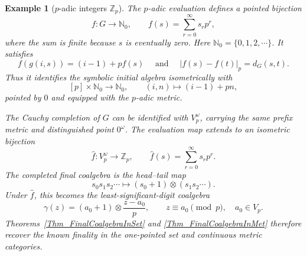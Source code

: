 \documentclass{sn-jnl}%
\theoremstyle{thmstyleone}%
\theoremstyle{thmstyletwo}%
\newtheorem{example}{Example}%
\theoremstyle{thmstylethree}%
\begin{document}
\begin{example}[$p$-adic integers $\mathbb Z_p$]
    The $p$-adic evaluation defines a pointed bijection
    \begin{equation} 
    \nonumber
        f:G\longrightarrow\mathbb N_0,\qquad  f(s)=\sum_{r=0}^{\infty}s_rp^r,
    \end{equation}
    where the sum is finite because $s$ is eventually zero. Here $\mathbb N_0 = \{0,1,2,\cdots\}$. It satisfies
    \begin{equation} 
    \nonumber
        f(g(i,s))=(i-1)+pf(s) \quad\text{ and } \quad |f(s)-f(t)|_p=d_G(s,t).
    \end{equation}
    Thus it identifies the symbolic initial algebra isometrically with
    \begin{equation} 
    \nonumber
        [p]\times\mathbb N_0\longrightarrow\mathbb N_0, \qquad (i,n)\longmapsto (i-1)+pn,
    \end{equation}
    pointed by $0$ and equipped with the $p$-adic metric.
    
    The Cauchy completion of $G$ can be identified with $V_p^\omega$, carrying the same prefix metric and distinguished point $0^\omega$. The evaluation map extends to an isometric bijection
    \begin{equation} 
    \nonumber
        \widehat f:V_p^\omega \longrightarrow \mathbb Z_p, \qquad \widehat f(s)=\sum_{r=0}^{\infty}s_rp^r.
    \end{equation}
    The completed final coalgebra is the head--tail map
    \begin{equation} 
    \nonumber
        s_0s_1s_2 \cdots \longmapsto (s_0+1)\otimes(s_1s_2\cdots).
    \end{equation}
    Under $\widehat f$, this becomes the least-significant-digit coalgebra
    \begin{equation} 
    \nonumber
        \gamma(z)=(a_0+1)\otimes\frac{z-a_0}{p}, \qquad z\equiv a_0\pmod p,\quad  a_0\in V_p.
    \end{equation}
    Theorems~\ref{Thm_FinalCoalgebraInSet} and \ref{Thm_FinalCoalgebraInMet} therefore recover the known finality in the one-pointed set and continuous metric categories. 
 \end{example}
\end{document}
